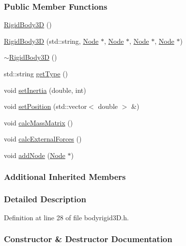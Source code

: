 \subsubsection*{Public Member Functions}
\begin{DoxyCompactItemize}
\item 
\hyperlink{classmknix_1_1_rigid_body3_d_a7132ea2cee0893fa935fccb25cf314f9}{Rigid\+Body3\+D} ()
\item 
\hyperlink{classmknix_1_1_rigid_body3_d_a31e0a621a3213010194b4b46310346c3}{Rigid\+Body3\+D} (std\+::string, \hyperlink{classmknix_1_1_node}{Node} $\ast$, \hyperlink{classmknix_1_1_node}{Node} $\ast$, \hyperlink{classmknix_1_1_node}{Node} $\ast$, \hyperlink{classmknix_1_1_node}{Node} $\ast$)
\item 
\hyperlink{classmknix_1_1_rigid_body3_d_a34e8faafa4f7be677eca2b1400f85863}{$\sim$\+Rigid\+Body3\+D} ()
\item 
std\+::string \hyperlink{classmknix_1_1_rigid_body3_d_a3cdb37910a3ed061017926d67932ad06}{get\+Type} ()
\item 
void \hyperlink{classmknix_1_1_rigid_body3_d_aa76bf1fe9fe4783d647d84c925540515}{set\+Inertia} (double, int)
\item 
void \hyperlink{classmknix_1_1_rigid_body3_d_ac69cc57cafc9c9783da8d7e66124151d}{set\+Position} (std\+::vector$<$ double $>$ \&)
\item 
void \hyperlink{classmknix_1_1_rigid_body3_d_a257d9b0bb9fe27664227270cd73194a4}{calc\+Mass\+Matrix} ()
\item 
void \hyperlink{classmknix_1_1_rigid_body3_d_a66bff0110ce5d201875f068050c84c96}{calc\+External\+Forces} ()
\item 
void \hyperlink{classmknix_1_1_rigid_body3_d_a276784501249da5c366003a27afba4ea}{add\+Node} (\hyperlink{classmknix_1_1_node}{Node} $\ast$)
\end{DoxyCompactItemize}
\subsubsection*{Additional Inherited Members}


\subsubsection{Detailed Description}


Definition at line 28 of file bodyrigid3\+D.\+h.



\subsubsection{Constructor \& Destructor Documentation}
\hypertarget{classmknix_1_1_rigid_body3_d_a7132ea2cee0893fa935fccb25cf314f9}{}

